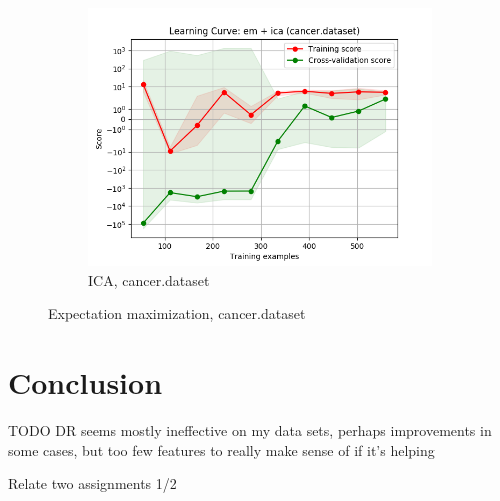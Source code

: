 \documentclass{article}
\begin{document}
\begin{figure}[htb]
\begin{subfigure}{0.33\textwidth}
        \includegraphics[width=\linewidth]{out/cluster_dr/cancer-em-ica-learning.png}
        \caption{ICA, cancer.dataset}
      \end{subfigure}

    \caption{Expectation maximization, cancer.dataset}
    \label{fig:cdr-plot-em-cancer}
    \end{figure}

  \section{Conclusion}
    TODO DR seems mostly ineffective on my data sets, perhaps improvements in some cases, but too few features to really make sense of if it's helping 

    Relate two assignments 1/2
\end{document}
